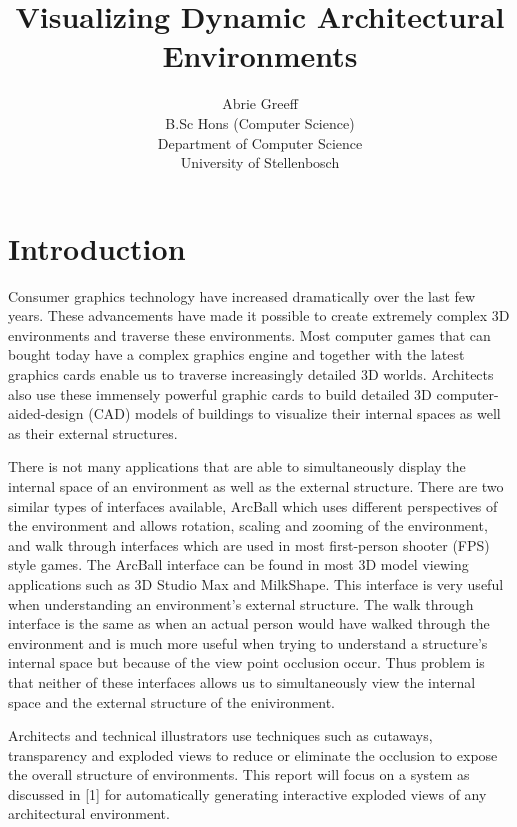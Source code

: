 \documentclass[a4paper,11pt,titlepage]{article}
\author{Abrie Greeff\\B.Sc Hons (Computer Science)\\Department of Computer Science\\University of Stellenbosch}
\title{Visualizing Dynamic Architectural Environments}
\begin{document}
\maketitle
\tableofcontents
\section{Introduction}
Consumer graphics technology have increased dramatically over the last few years. These advancements have made it possible to create extremely complex 3D environments and traverse these environments. Most computer games that can bought today have a complex graphics engine and together with the latest graphics cards enable us to traverse increasingly detailed 3D worlds. Architects also use these immensely powerful graphic cards to build detailed 3D computer-aided-design (CAD) models of buildings to visualize their internal spaces as well as their external structures.

There is not many applications that are able to simultaneously display the internal space of an environment as well as the external structure. There are two similar types of interfaces available, ArcBall which uses different perspectives of the environment and allows rotation, scaling and zooming of the environment, and walk through interfaces which are used in most first-person shooter (FPS) style games. The ArcBall interface can be found in most 3D model viewing applications such as 3D Studio Max and MilkShape. This interface is very useful when understanding an environment's external structure. The walk through interface is the same as when an actual person would have walked through the environment and is much more useful when trying to understand a structure's internal space but because of the view point occlusion occur. Thus problem is that neither of these interfaces allows us to simultaneously view the internal space and the external structure of the enivironment.

Architects and technical illustrators use techniques such as cutaways, transparency and exploded views to reduce or eliminate the occlusion to expose the overall structure of environments. This report will focus on a system as discussed in [1] for automatically generating interactive exploded views of any architectural environment.
\end{document}
